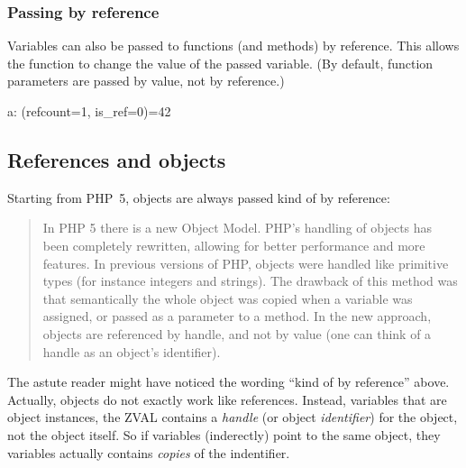 \subsubsection{Passing by reference}

Variables can also be passed to functions (and methods) by reference. \cite{php-manual-passing-by-reference} This allows the function to change the value of the passed variable. (By default, function parameters are passed by value, not by reference.)


\begin{textcode}
a: (refcount=1, is_ref=0)=42
\end{textcode}


\subsection{References and objects}

Starting from PHP~5, objects are always passed kind of by reference:~\cite{php-manual-migration5-oop}

\begin{quote}
In PHP 5 there is a new Object Model. PHP's handling of objects has been completely rewritten, allowing for better performance and more features. In previous versions of PHP, objects were handled like primitive types (for instance integers and strings). The drawback of this method was that semantically the whole object was copied when a variable was assigned, or passed as a parameter to a method. In the new approach, objects are referenced by handle, and not by value (one can think of a handle as an object's identifier).
\end{quote}

The astute reader might have noticed the wording ``kind of by reference'' above. Actually, objects do not exactly work like references. Instead, variables that are object instances, the ZVAL contains a \emph{handle} (or object \emph{identifier}) for the object, not the object itself. So if variables (inderectly) point to the same object, they variables actually contains \emph{copies} of the indentifier.~\cite{php-manual-oop-references}

